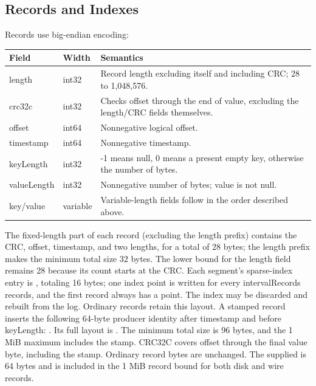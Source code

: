 \subsection{Records and Indexes}
Records use big-endian encoding:
\begin{center}
\begin{tabular}{p{}p{}p{}}
\toprule
Field & Width & Semantics \\
\midrule
length & int32 & Record length excluding itself and including CRC; 28 to 1,048,576.\\
crc32c & int32 & Checks offset through the end of value, excluding the length/CRC fields themselves.\\
offset & int64 & Nonnegative logical offset.\\
timestamp & int64 & Nonnegative timestamp.\\
keyLength & int32 & -1 means null, 0 means a present empty key, otherwise the number of bytes.\\
valueLength & int32 & Nonnegative number of bytes; value is not null.\\
key/value & variable & Variable-length fields follow in the order described above.\\
\bottomrule
\end{tabular}
\end{center}
The fixed-length part of each record (excluding the length prefix) contains the CRC, offset, timestamp, and two lengths, for a total of 28 bytes; the length prefix makes the minimum total size 32 bytes. The lower bound for the length field remains 28 because its count starts at the CRC. Each segment's sparse-index entry is , totaling 16 bytes; one index point is written for every intervalRecords records, and the first record always has a point. The index may be discarded and rebuilt from the log.
Ordinary records retain this layout. A stamped record inserts the following 64-byte producer identity after timestamp and before keyLength: . Its full layout is . The minimum total size is 96 bytes, and the 1 MiB maximum includes the stamp. CRC32C covers offset through the final value byte, including the stamp. Ordinary record bytes are unchanged.
The supplied  is 64 bytes and is included in the 1 MiB record bound for both disk and  wire records.

